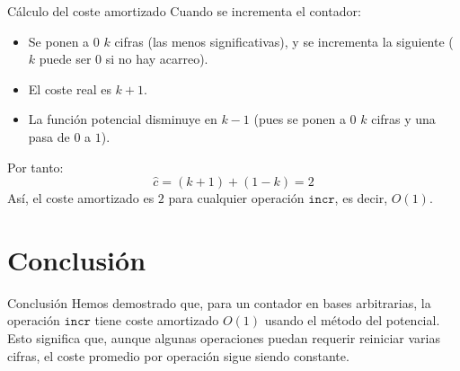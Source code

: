 \documentclass[aspectratio=169]{beamer}
\begin{document}
\begin{frame}{Cálculo del coste amortizado}
    Cuando se incrementa el contador:
    \begin{itemize}
        \item Se ponen a $0$ $k$ cifras (las menos significativas), y se incrementa la siguiente ($k$ puede ser $0$ si no hay acarreo).
        \item El coste real es $k+1$.
        \item La función potencial disminuye en $k-1$ (pues se ponen a $0$ $k$ cifras y una pasa de $0$ a $1$).
    \end{itemize}
    Por tanto:
    \[
    \hat{c} = (k+1) + (1-k) = 2
    \]
    Así, el coste amortizado es $2$ para cualquier operación $\texttt{incr}$, es decir, $O(1)$.
\end{frame}


\section{Conclusión}
\begin{frame}{Conclusión}
    Hemos demostrado que, para un contador en bases arbitrarias, la operación $\texttt{incr}$ tiene coste amortizado $O(1)$ usando el método del potencial. Esto significa que, aunque algunas operaciones puedan requerir reiniciar varias cifras, el coste promedio por operación sigue siendo constante.
\end{frame}
\end{document}
